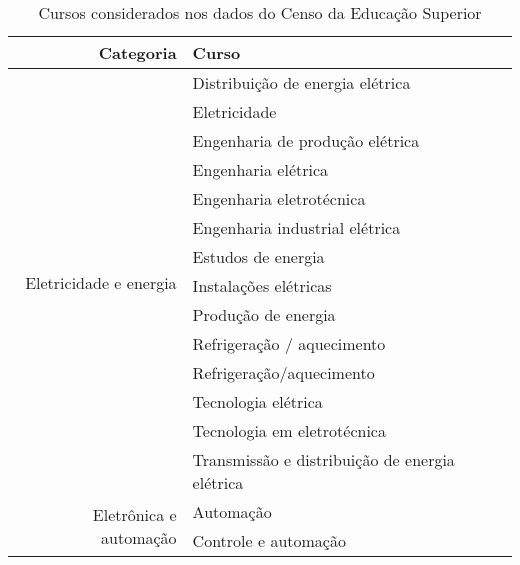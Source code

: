 \documentclass[grad,numbers]{coppe}
\begin{document}
	\begin{table}[]
		\centering
		\caption{Cursos considerados nos dados do Censo da Educação Superior}
		\label{tab:cursosCenso}
		\begin{tabular}{|r||l||}
			\hline
			                               Categoria & Curso                                          \\ \hline
			\multirow{14}{*}{Eletricidade e energia} & Distribuição de energia elétrica               \\
			                                         & Eletricidade                                   \\
			                                         & Engenharia de produção elétrica                \\
			                                         & Engenharia elétrica                            \\
			                                         & Engenharia eletrotécnica                       \\
			                                         & Engenharia industrial elétrica                 \\
			                                         & Estudos de energia                             \\
			                                         & Instalações elétricas                          \\
			                                         & Produção de energia                            \\
			                                         & Refrigeração / aquecimento                     \\
			                                         & Refrigeração/aquecimento                       \\
			                                         & Tecnologia elétrica                            \\
			                                         & Tecnologia em eletrotécnica                    \\
			                                         & Transmissão e distribuição de energia elétrica \\ \hline
			\multirow{23}{*}{Eletrônica e automação} & Automação                                      \\
			                                         & Controle e automação                           \\

\end{tabular}
\end{table}
\end{document}

